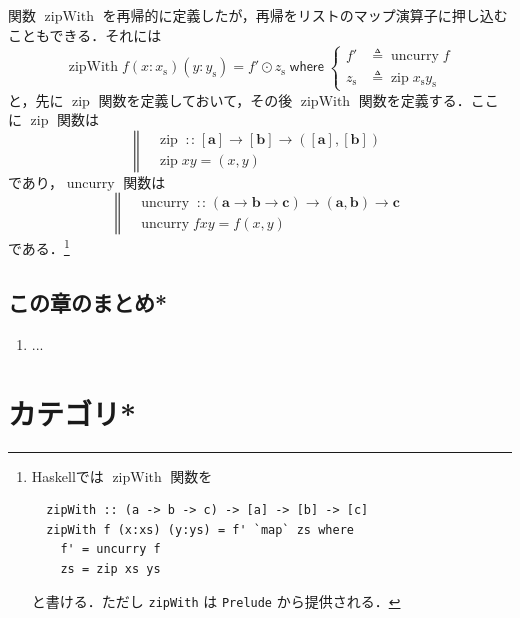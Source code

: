 \documentclass[a5paper,twoside,fleqn,draft]{jsbook}
\newcommand{\programminglanguage}[1]{\textsf{#1}}
\newcommand{\haskell}{\programminglanguage{Haskell}}
\newcommand{\code}[1]{\texttt{#1}}
\newcommand{\filename}[1]{\texttt{#1}}
\newcommand{\mBrace}{\Vert}
\newcommand{\mKeyword}[1]{\mathsf{#1}}
\newcommand{\mWhereKeyword}{\mKeyword{where}}
\DeclareMathOperator{\mWhere}{\mWhereKeyword}
\newcommand{\mSpecialFunc}[1]{\mathrm{#1}}
\DeclareMathOperator{\mUncurry}{\mSpecialFunc{uncurry}}
\DeclareMathOperator{\mZipFunc}{\mSpecialFunc{zip}}
\DeclareMathOperator{\mZipWith}{\mSpecialFunc{zipWith}}
\DeclareMathOperator{\mFuncArrow}{\rightarrow}
\DeclareMathOperator{\mIn}{{:\!:}}
\DeclareMathOperator{\mLetEq}{\triangleq}
\DeclareMathOperator{\mMapList}{\odot}
\newcommand{\mType}[1]{\mathbf{#1}} %
\newcommand{\mA}{\mType{a}}
\newcommand{\mB}{\mType{b}}
\newcommand{\mC}{\mType{c}}
\newcommand{\mList}[1]{{#1}_\mathrm{s}}
\newcommand{\mProjEXP}[2]{#1\mFuncArrow#2} %
\begin{document}
関数 $\mZipWith$ を再帰的に定義したが，再帰をリストのマップ演算子に押し込むこともできる．それには
\begin{equation}
  \mZipWith f(x:\mList{x})(y:\mList{y})
  =f'\mMapList\mList{z}
  \mWhere
  \left\{
  \begin{aligned}
    f'
    &\mLetEq\mUncurry f\\
    \mList{z}
    &\mLetEq\mZipFunc\mList{x}\mList{y}
  \end{aligned}
  \right.
\end{equation}
と，先に $\mZipFunc$ 関数を定義しておいて，その後 $\mZipWith$ 関数を定義する．ここに $\mZipFunc$ 関数は
\begin{equation}
  \left\mBrace
  \begin{aligned}
    {}&\mZipFunc\mIn{}\mProjEXP{[\mA]}
    {\mProjEXP{[\mB]}
      {([\mA],[\mB])}}\\
    {}&\mZipFunc xy=(x,y)
  \end{aligned}
  \right.
\end{equation}
であり，$\mUncurry$ 関数は
\begin{equation}
  \left\mBrace
  \begin{aligned}
    {}&\mUncurry\mIn{}
    \mProjEXP{(\mProjEXP{\mA }{\mProjEXP{\mB }{\mC }})}
          {\mProjEXP{(\mA ,\mB )}{\mC }}\\
          {}&\mUncurry fxy=f(x,y)
  \end{aligned}
  \right.
\end{equation}
である．\footnote{\haskell では $\mZipWith$ 関数を
\begin{verbatim}
  zipWith :: (a -> b -> c) -> [a] -> [b] -> [c]
  zipWith f (x:xs) (y:ys) = f' `map` zs where
    f' = uncurry f
    zs = zip xs ys
\end{verbatim}
と書ける．ただし \code{zipWith} は \filename{Prelude} から提供される．}


\section{この章のまとめ*}

\begin{enumerate}
\item ...
\end{enumerate}

\chapter{カテゴリ*}
\label{ch:category}
\end{document}
